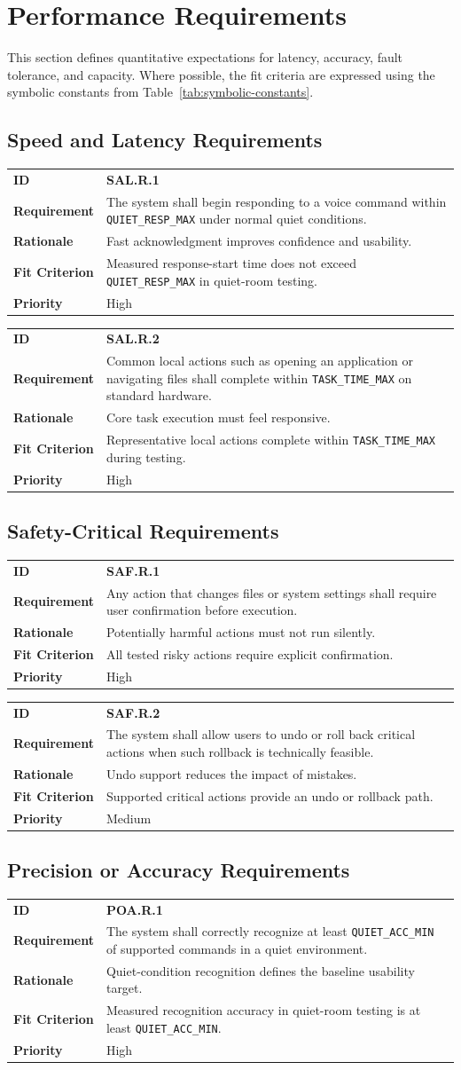 \documentclass[12pt]{article}
\makeatletter
\newcommand{\reqcard}[5]{%
\noindent\begin{tabularx}{\textwidth}{@{}p{2.35cm}X@{}}
\textbf{ID} & \textbf{#1} \\
\textbf{Requirement} & #2 \\
\textbf{Rationale} & #3 \\
\textbf{Fit Criterion} & #4 \\
\textbf{Priority} & #5 \\
\end{tabularx}\par\medskip
}
\makeatother
\begin{document}
\section{Performance Requirements}
This section defines quantitative expectations for latency, accuracy,
fault tolerance, and capacity. Where possible, the fit criteria are
expressed using the symbolic constants from
Table~\ref{tab:symbolic-constants}.

\subsection{Speed and Latency Requirements}
\reqcard{SAL.R.1}{The system shall begin responding to a voice
command within \texttt{QUIET\_RESP\_MAX} under normal quiet
conditions.}{Fast acknowledgment improves confidence and
usability.}{Measured response-start time does not exceed
\texttt{QUIET\_RESP\_MAX} in quiet-room testing.}{High}

\reqcard{SAL.R.2}{Common local actions such as opening an application
or navigating files shall complete within \texttt{TASK\_TIME\_MAX} on
standard hardware.}{Core task execution must feel
responsive.}{Representative local actions complete within
\texttt{TASK\_TIME\_MAX} during testing.}{High}

\subsection{Safety-Critical Requirements}
\reqcard{SAF.R.1}{Any action that changes files or system settings
shall require user confirmation before execution.}{Potentially harmful
actions must not run silently.}{All tested risky actions require
explicit confirmation.}{High}

\reqcard{SAF.R.2}{The system shall allow users to undo or roll back
critical actions when such rollback is technically feasible.}{Undo
support reduces the impact of mistakes.}{Supported critical actions
provide an undo or rollback path.}{Medium}

\subsection{Precision or Accuracy Requirements}
\reqcard{POA.R.1}{The system shall correctly recognize at least
\texttt{QUIET\_ACC\_MIN} of supported commands in a quiet
environment.}{Quiet-condition recognition defines the baseline
usability target.}{Measured recognition accuracy in quiet-room testing
is at least \texttt{QUIET\_ACC\_MIN}.}{High}
\end{document}
